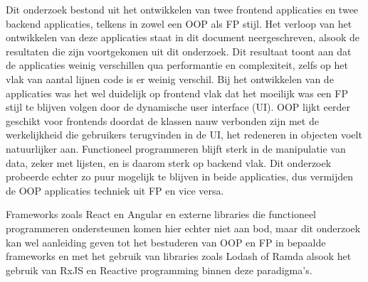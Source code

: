 Dit onderzoek bestond uit het ontwikkelen van twee frontend applicaties en twee backend applicaties, telkens in zowel een OOP als FP stijl. Het verloop van het ontwikkelen van deze applicaties staat in dit document neergeschreven, alsook de resultaten die zijn voortgekomen uit dit onderzoek. Dit resultaat toont aan dat de applicaties weinig verschillen qua performantie en complexiteit, zelfs op het vlak van aantal lijnen code is er weinig verschil. Bij het ontwikkelen van de applicaties was het wel duidelijk op frontend vlak dat het moeilijk was een FP stijl te blijven volgen door de dynamische user interface (UI). OOP lijkt eerder geschikt voor frontends doordat de klassen nauw verbonden zijn met de werkelijkheid die gebruikers terugvinden in de UI, het redeneren in objecten voelt natuurlijker aan. Functioneel programmeren blijft sterk in de manipulatie van data, zeker met lijsten, en is daarom sterk op backend vlak. Dit onderzoek probeerde echter zo puur mogelijk te blijven in beide applicaties, dus vermijden de OOP applicaties techniek uit FP en vice versa. 

Frameworks zoals React en Angular en externe libraries die functioneel programmeren ondersteunen komen hier echter niet aan bod, maar dit onderzoek kan wel aanleiding geven tot het bestuderen van OOP en FP in bepaalde frameworks en met het gebruik van libraries zoals Lodash of Ramda alsook het gebruik van RxJS en Reactive programming binnen deze paradigma's.
